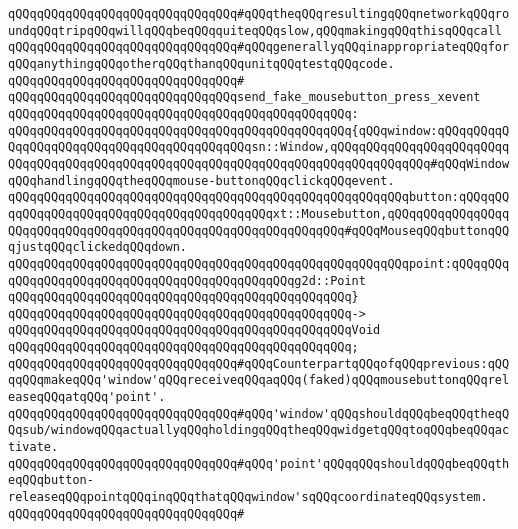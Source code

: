\verb|qQQqqQQqqQQqqQQqqQQqqQQqqQQqqQQq#qQQqtheqQQqresultingqQQqnetworkqQQqroundqQQqtripqQQqwillqQQqbeqQQqquiteqQQqslow,qQQqmakingqQQqthisqQQqcall|\newline
\verb|qQQqqQQqqQQqqQQqqQQqqQQqqQQqqQQq#qQQqgenerallyqQQqinappropriateqQQqforqQQqanythingqQQqotherqQQqthanqQQqunitqQQqtestqQQqcode.|\newline
\verb|qQQqqQQqqQQqqQQqqQQqqQQqqQQqqQQq#|\newline
\verb|qQQqqQQqqQQqqQQqqQQqqQQqqQQqqQQqsend_fake_mousebutton_press_xevent|\newline
\verb|qQQqqQQqqQQqqQQqqQQqqQQqqQQqqQQqqQQqqQQqqQQqqQQq:|\newline
\verb|qQQqqQQqqQQqqQQqqQQqqQQqqQQqqQQqqQQqqQQqqQQqqQQq{qQQqwindow:qQQqqQQqqQQqqQQqqQQqqQQqqQQqqQQqqQQqqQQqqQQqsn::Window,qQQqqQQqqQQqqQQqqQQqqQQqqQQqqQQqqQQqqQQqqQQqqQQqqQQqqQQqqQQqqQQqqQQqqQQqqQQqqQQqqQQq#qQQqWindowqQQqhandlingqQQqtheqQQqmouse-buttonqQQqclickqQQqevent.|\newline
\verb|qQQqqQQqqQQqqQQqqQQqqQQqqQQqqQQqqQQqqQQqqQQqqQQqqQQqqQQqbutton:qQQqqQQqqQQqqQQqqQQqqQQqqQQqqQQqqQQqqQQqqQQqxt::Mousebutton,qQQqqQQqqQQqqQQqqQQqqQQqqQQqqQQqqQQqqQQqqQQqqQQqqQQqqQQqqQQqqQQq#qQQqMouseqQQqbuttonqQQqjustqQQqclickedqQQqdown.|\newline
\verb|qQQqqQQqqQQqqQQqqQQqqQQqqQQqqQQqqQQqqQQqqQQqqQQqqQQqqQQqpoint:qQQqqQQqqQQqqQQqqQQqqQQqqQQqqQQqqQQqqQQqqQQqqQQqg2d::Point|\newline
\verb|qQQqqQQqqQQqqQQqqQQqqQQqqQQqqQQqqQQqqQQqqQQqqQQq}|\newline
\verb|qQQqqQQqqQQqqQQqqQQqqQQqqQQqqQQqqQQqqQQqqQQqqQQq->|\newline
\verb|qQQqqQQqqQQqqQQqqQQqqQQqqQQqqQQqqQQqqQQqqQQqqQQqVoid|\newline
\verb|qQQqqQQqqQQqqQQqqQQqqQQqqQQqqQQqqQQqqQQqqQQqqQQq;|\newline
\newline
\verb|qQQqqQQqqQQqqQQqqQQqqQQqqQQqqQQq#qQQqCounterpartqQQqofqQQqprevious:qQQqqQQqmakeqQQq'window'qQQqreceiveqQQqaqQQq(faked)qQQqmousebuttonqQQqreleaseqQQqatqQQq'point'.|\newline
\verb|qQQqqQQqqQQqqQQqqQQqqQQqqQQqqQQq#qQQq'window'qQQqshouldqQQqbeqQQqtheqQQqsub/windowqQQqactuallyqQQqholdingqQQqtheqQQqwidgetqQQqtoqQQqbeqQQqactivate.|\newline
\verb|qQQqqQQqqQQqqQQqqQQqqQQqqQQqqQQq#qQQq'point'qQQqqQQqshouldqQQqbeqQQqtheqQQqbutton-releaseqQQqpointqQQqinqQQqthatqQQqwindow'sqQQqcoordinateqQQqsystem.|\newline
\verb|qQQqqQQqqQQqqQQqqQQqqQQqqQQqqQQq#|\newline
